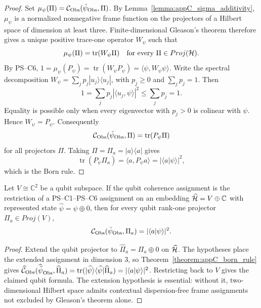 \begin{proof}
\label{proof:appC_born_rule}
Set $\mu_\psi(\Pi)=\mathcal{C}_{\mathrm{Obs}}(\tilde\psi_{\mathrm{Obs}},\Pi)$. By
Lemma~\ref{lemma:appC_sigma_additivity}, $\mu_\psi$ is a normalized nonnegative
frame function on the projectors of a Hilbert space of dimension at least three.
Finite-dimensional Gleason's theorem therefore gives a unique positive trace-one
operator $W_\psi$ such that
\[
\mu_\psi(\Pi)=\operatorname{tr}(W_\psi\Pi)
\quad\text{for every }\Pi\in Proj(\mathcal{H}).
\]
By PS--C6, $1=\mu_\psi(P_\psi)=\operatorname{tr}(W_\psi P_\psi)
=\langle\psi,W_\psi\psi\rangle$. Write the spectral decomposition
$W_\psi=\sum_j p_j |u_j\rangle\langle u_j|$, with $p_j\ge0$ and
$\sum_j p_j=1$. Then
\[
1=\sum_j p_j |\langle u_j,\psi\rangle|^2 \le \sum_j p_j=1.
\]
Equality is possible only when every eigenvector with $p_j>0$ is colinear with
$\psi$. Hence $W_\psi=P_\psi$. Consequently
\[
\mathcal{C}_{\mathrm{Obs}}(\tilde\psi_{\mathrm{Obs}},\Pi)
=\operatorname{tr}(P_\psi\Pi)
\]
for all projectors $\Pi$. Taking $\Pi=\Pi_a=|a\rangle\langle a|$ gives
\[
\operatorname{tr}(P_\psi\Pi_a)=\langle a,P_\psi a\rangle
=|\langle a|\psi\rangle|^2,
\]
which is the Born rule.
\end{proof}

\begin{corollary}[Qubit case \texorpdfstring{$d = 2$}{d = 2}]
\label{corollary:appC_qubit_case}
Let $V\cong\mathbb{C}^2$ be a qubit subspace. If the qubit coherence assignment is
the restriction of a PS--C1--PS--C6 assignment on an embedding
$\widehat{\mathcal{H}}=V\oplus\mathbb{C}$ with represented state
$\widehat\psi=\psi\oplus0$, then for every qubit rank-one projector
$\Pi_a\in Proj(V)$,
\[
\mathcal{C}_{\mathrm{Obs}}(\tilde\psi_{\mathrm{Obs}},\Pi_a)=|\langle a|\psi\rangle|^2.
\]
\end{corollary}

\begin{proof}
\label{proof:appC_qubit_case}
Extend the qubit projector to $\widehat\Pi_a=\Pi_a\oplus0$ on
$\widehat{\mathcal{H}}$. The hypotheses place the extended assignment in dimension
$3$, so Theorem~\ref{theorem:appC_born_rule} gives
$\widehat{\mathcal C}_{\mathrm{Obs}}(\widehat{\tilde\psi}_{\mathrm{Obs}},\widehat\Pi_a)
=\operatorname{tr}(|\widehat\psi\rangle\langle\widehat\psi|\widehat\Pi_a)
=|\langle a|\psi\rangle|^2$. Restricting back to $V$ gives the claimed qubit
formula. The extension hypothesis is essential: without it, two-dimensional
Hilbert space admits contextual dispersion-free frame assignments not excluded by
Gleason's theorem alone.
\end{proof}


